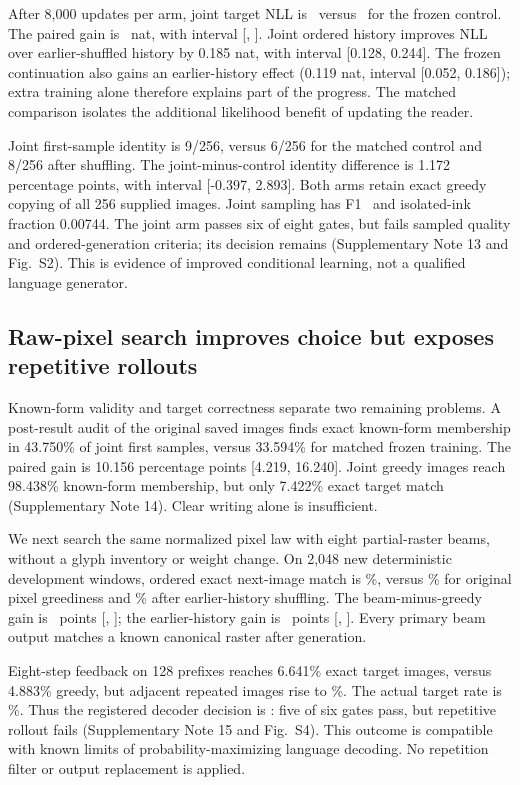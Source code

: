 After 8,000 updates per arm, joint target NLL is \JointNll\ versus
\ControlNll\ for the frozen control. The paired gain is \JointNllGain\ nat,
with interval [\JointNllLow, \JointNllHigh]. Joint ordered history improves
NLL over earlier-shuffled history by 0.185 nat, with interval [0.128, 0.244].
The frozen continuation also gains an earlier-history effect (0.119 nat,
interval [0.052, 0.186]); extra training alone therefore explains part of the
progress. The matched comparison isolates the additional likelihood benefit
of updating the reader.

Joint first-sample identity is 9/256, versus 6/256 for the matched control and
8/256 after shuffling. The joint-minus-control identity difference is 1.172
percentage points, with interval [-0.397, 2.893]. Both arms retain exact greedy
copying of all 256 supplied images. Joint sampling has F1 \JointSampleFone\
and isolated-ink fraction 0.00744. The joint arm passes six of eight gates,
but fails sampled quality and ordered-generation criteria; its decision remains
\texttt{\JointDecision} (Supplementary Note 13 and Fig.~S2).
This is evidence of improved conditional learning, not a qualified language
generator.

\subsection*{Raw-pixel search improves choice but exposes repetitive rollouts}
Known-form validity and target correctness separate two remaining problems.
A post-result audit of the original saved images finds exact known-form
membership in 43.750\% of joint first samples, versus 33.594\% for matched
frozen training. The paired gain is 10.156 percentage points [4.219, 16.240].
Joint greedy images reach 98.438\% known-form membership, but only 7.422\%
exact target match (Supplementary Note 14). Clear writing alone is insufficient.

We next search the same normalized pixel law with eight partial-raster beams,
without a glyph inventory or weight change. On 2,048 new deterministic
development windows, ordered exact next-image match is \BeamAccuracy\%,
versus \GreedyAccuracy\% for original pixel greediness and \BeamShuffled\%
after earlier-history shuffling. The beam-minus-greedy gain is \BeamGain\
points [\BeamGainLow, \BeamGainHigh]; the earlier-history gain is
\BeamHistoryGain\ points [\BeamHistoryLow, \BeamHistoryHigh]. Every primary
beam output matches a known canonical raster after generation.

Eight-step feedback on 128 prefixes reaches 6.641\% exact target images,
versus 4.883\% greedy, but adjacent repeated images rise to \BeamRepeat\%.
The actual target rate is \TargetRepeat\%. Thus the registered decoder
decision is \texttt{\BeamDecision}: five of six gates pass, but repetitive
rollout fails (Supplementary Note 15 and Fig.~S4). This outcome is compatible
with known limits of probability-maximizing language decoding\cite{degeneration}.
No repetition filter or output replacement is applied.

